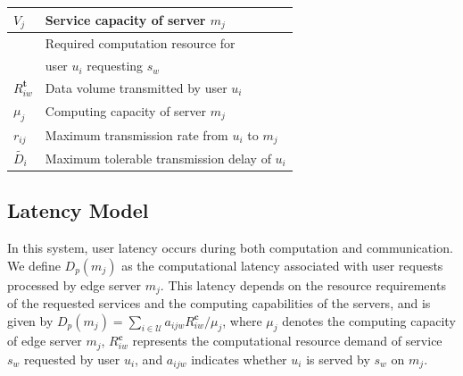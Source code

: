 \documentclass[10pt, conference, letterpaper]{IEEEtran}
\newenvironment{revision}{\begingroup\color{blue}}{\endgroup}
\newenvironment{revision}{\begingroup}{\endgroup}
\begin{document}
\begin{table}[!t]
\begin{tabular}{|>{\centering\arraybackslash}m{2cm}|>{\raggedright\arraybackslash}m{6cm}|}
    $V_j$ & Service capacity of server $m_j$ \\ \hline
    \multirow{2}{*}{$R^{\textbf{c}}_{iw}$} & Required computation resource for \\ 
    & user $u_i$ requesting $s_w$ \\ \hline
    $R^{\textbf{t}}_{iw}$ & Data volume transmitted by user $u_i$ \\ \hline
    $\mu_j$ & Computing capacity of server $m_j$ \\ \hline
    $r_{ij}$ & Maximum transmission rate from $u_i$ to $m_j$ \\ \hline
    $\widetilde{D_i}$ & Maximum tolerable transmission delay of $u_i$ \\ \hline
\end{tabular}
\end{table}

\subsection{Latency Model}
\begin{revision}
In this system, user latency occurs during both computation and communication. We define $D_{p}(m_j)$ as the computational latency associated with user requests processed by edge server $m_j$. This latency depends on the resource requirements of the requested services and the computing capabilities of the servers, and is given by $D_{p}(m_j)=\sum_{i\in\mathcal{U}}a_{ijw}R^{\textbf{c}}_{iw}/\mu_j$, where $\mu_j$ denotes the computing capacity of edge server $m_j$, $R^{\textbf{c}}_{iw}$ represents the computational resource demand of service $s_w$ requested by user $u_i$, and $a_{ijw}$ indicates whether $u_i$ is served by $s_w$ on $m_j$.
\end{revision}
\end{document}
